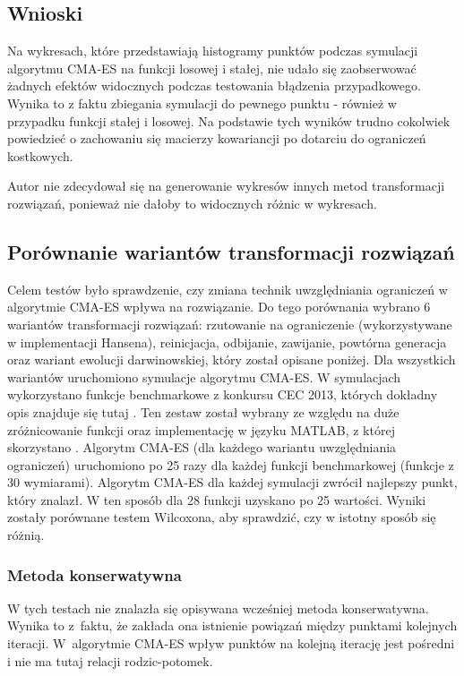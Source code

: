 \documentclass{mini}
\begin{document}
\subsection{Wnioski}
Na wykresach, które przedstawiają histogramy punktów podczas symulacji algorytmu CMA-ES na funkcji losowej i stałej, nie udało się zaobserwować żadnych efektów widocznych podczas testowania błądzenia przypadkowego. Wynika to z faktu zbiegania symulacji do pewnego punktu - również w przypadku funkcji stałej i losowej. Na podstawie tych wyników trudno cokolwiek powiedzieć o zachowaniu się macierzy kowariancji po dotarciu do ograniczeń kostkowych.

Autor nie zdecydował się na generowanie wykresów innych metod transformacji rozwiązań, ponieważ nie dałoby to widocznych różnic w wykresach.

\subsection{Porównanie wariantów transformacji rozwiązań}
Celem testów było sprawdzenie, czy zmiana technik uwzględniania ograniczeń w algorytmie CMA-ES wpływa na rozwiązanie. Do tego porównania wybrano 6 wariantów transformacji rozwiązań: rzutowanie na ograniczenie (wykorzystywane w implementacji Hansena), reinicjacja, odbijanie, zawijanie, powtórna generacja oraz wariant ewolucji darwinowskiej, który został opisane poniżej. Dla wszystkich wariantów uruchomiono symulacje algorytmu CMA-ES. W symulacjach wykorzystano funkcje benchmarkowe z konkursu CEC 2013, których dokładny opis znajduje się tutaj \cite{cec}. Ten zestaw został wybrany ze względu na duże zróżnicowanie funkcji oraz implementację w języku MATLAB, z której skorzystano \cite{cec_code}. Algorytm CMA-ES (dla każdego wariantu uwzględniania ograniczeń) uruchomiono po 25 razy dla każdej funkcji benchmarkowej (funkcje z 30 wymiarami). Algorytm CMA-ES dla każdej symulacji zwrócił najlepszy punkt, który znalazł. W ten sposób dla 28 funkcji uzyskano po 25 wartości. Wyniki zostały porównane testem Wilcoxona, aby sprawdzić, czy w istotny sposób się różnią.

\subsubsection*{Metoda konserwatywna}
W tych testach nie znalazła się opisywana wcześniej metoda konserwatywna. Wynika to z~faktu, że zakłada ona istnienie powiązań między punktami kolejnych iteracji. W~algorytmie CMA-ES wpływ punktów na kolejną iterację jest pośredni i nie ma tutaj relacji rodzic-potomek.
\end{document}
